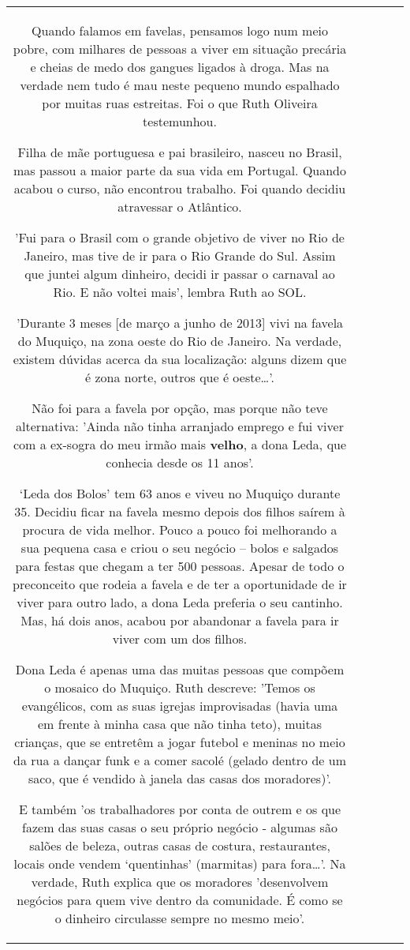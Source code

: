 \documentclass[11pt]{article}
\newlength\mylength
\begin{document}
\begin{center}
\begin{longtable}{|C{.65\mylength}|C{.30\mylength}|C{.12\mylength}|C{.12\mylength}|C{.12\mylength}|}
Quando falamos em favelas, pensamos logo num meio pobre, com milhares de pessoas a viver em situação precária e cheias de medo dos gangues ligados à droga. Mas na verdade nem tudo é mau neste pequeno mundo espalhado por muitas ruas estreitas. Foi o que Ruth Oliveira testemunhou.

Filha de mãe portuguesa e pai brasileiro, nasceu no Brasil, mas passou a maior parte da sua vida em Portugal. Quando acabou o curso, não encontrou trabalho. Foi quando decidiu atravessar o Atlântico.

'Fui para o Brasil com o grande objetivo de viver no Rio de Janeiro, mas tive de ir para o Rio Grande do Sul. Assim que juntei algum dinheiro, decidi ir passar o carnaval ao Rio. E não voltei mais', lembra Ruth ao SOL.

'Durante 3 meses [de março a junho de 2013] vivi na favela do Muquiço, na zona oeste do Rio de Janeiro. Na verdade, existem dúvidas acerca da sua localização: alguns dizem que é zona norte, outros que é oeste…'.

Não foi para a favela por opção, mas porque não teve alternativa: 'Ainda não tinha arranjado emprego e fui viver com a ex-sogra do meu irmão mais \textbf{velho}, a dona Leda, que conhecia desde os 11 anos'.

‘Leda dos Bolos' tem 63 anos e viveu no Muquiço durante 35. Decidiu ficar na favela mesmo depois dos filhos saírem à procura de vida melhor. Pouco a pouco foi melhorando a sua pequena casa e criou o seu negócio – bolos e salgados para festas que chegam a ter 500 pessoas. Apesar de todo o preconceito que rodeia a favela e de ter a oportunidade de ir viver para outro lado, a dona Leda preferia o seu cantinho. Mas, há dois anos, acabou por abandonar a favela para ir viver com um dos filhos.

Dona Leda é apenas uma das muitas pessoas que compõem o mosaico do Muquiço. Ruth descreve: 'Temos os evangélicos, com as suas igrejas improvisadas (havia uma em frente à minha casa que não tinha teto), muitas crianças, que se entretêm a jogar futebol e meninas no meio da rua a dançar funk e a comer sacolé (gelado dentro de um saco, que é vendido à janela das casas dos moradores)'.

E também 'os trabalhadores por conta de outrem e os que fazem das suas casas o seu próprio negócio - algumas são salões de beleza, outras casas de costura, restaurantes, locais onde vendem ‘quentinhas' (marmitas) para fora…'. Na verdade, Ruth explica que os moradores 'desenvolvem negócios para quem vive dentro da comunidade. É como se o dinheiro circulasse sempre no mesmo meio'.


\end{longtable}
\end{center}
\end{document}

